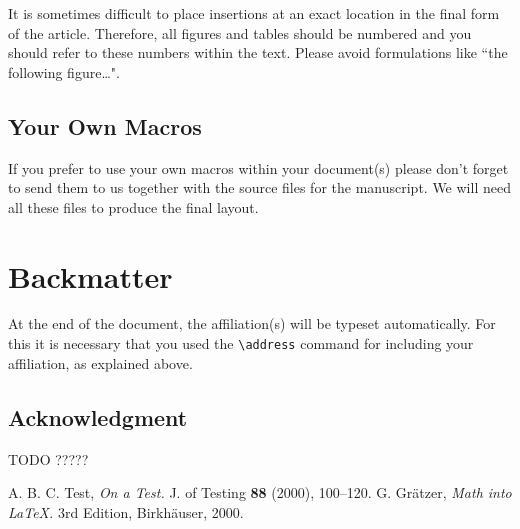 \documentclass{birkjour}
\theoremstyle{definition}
\theoremstyle{remark}
\numberwithin{equation}{section}
\begin{document}
It is sometimes difficult to place insertions at an exact location
in the final form of the article. Therefore, all figures and tables
should be numbered and you should refer to these numbers within
the text. Please avoid formulations like ``the following
figure\dots".

\subsection{Your Own Macros}

If you prefer to use your own macros within your document(s)
please don't forget to send them to us together with the source
files for the manuscript. We will need all these files to produce
the final layout.


\section{Backmatter}

At the end of the document, the affiliation(s) will be typeset
automatically. For this it is necessary that you used the \verb+\address+ command for including your affiliation, as explained above.



\subsection*{Acknowledgment}
TODO ?????


\begin{thebibliography}{1}
 A. B. C. Test, \textit{On a Test.} J. of Testing
\textbf{88} (2000), 100--120.
 G. Gr\"atzer, \textit{Math into \LaTeX.} 3rd Edition,
Birkh\"auser, 2000.
\end{thebibliography}

\end{document}
